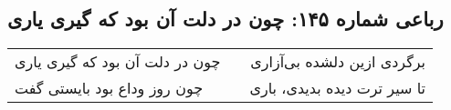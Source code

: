 \begin{center}
\section*{رباعی شماره ۱۴۵: چون در دلت آن بود که گیری یاری}
\label{sec:145}
\begin{longtable}{l p{0.5cm} r}
چون در دلت آن بود که گیری یاری
&&
برگردی ازین دلشده بی‌آزاری
\\
چون روز وداع بود بایستی گفت
&&
تا سیر ترت دیده بدیدی، باری
\\
\end{longtable}
\end{center}
